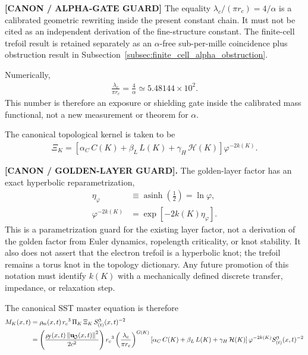 \documentclass[11pt]{article}
\theoremstyle{definition}
\theoremstyle{plain}
\theoremstyle{remark}
\newcommand{\swirlarrow}{\mathchoice{\mkern-2mu\scriptstyle\boldsymbol{\circlearrowleft}}{\mkern-2mu\scriptstyle\boldsymbol{\circlearrowleft}}{\mkern-2mu\scriptscriptstyle\boldsymbol{\circlearrowleft}}{\mkern-2mu\scriptscriptstyle\boldsymbol{\circlearrowleft}}}
\newcommand{\rhoF}{{\rho_{\!f}}}
\newcommand{\rhoM}{\rho_{\!m}}
\newcommand{\SwirlClock}{{S_{(t)}^{\swirlarrow}}}
\newcommand{\rc}{{r_c}}
\newcommand{\uswirl}{\mathbf{u}_{\!\boldsymbol{\circlearrowleft}}}
\begin{document}
        \textbf{[CANON / ALPHA-GATE GUARD]} The equality \(\lambda_c/(\pi\rc)=4/\alpha\) is a calibrated geometric rewriting inside the present constant chain. It must not be cited as an independent derivation of the fine-structure constant. The finite-cell trefoil result is retained separately as an \(\alpha\)-free sub-per-mille coincidence plus obstruction result in Subsection~\ref{subsec:finite_cell_alpha_obstruction}.

        Numerically,
        \begin{align}
            \frac{\lambda_c}{\pi\rc}
            =
            \frac{4}{\alpha}
            \simeq 5.48144\times10^{2}.
            \label{eq:alpha_gate_numeric_guard}
        \end{align}
        This number is therefore an exposure or shielding gate inside the calibrated mass functional, not a new measurement or theorem for \(\alpha\).


        The canonical topological kernel is taken to be
        \begin{align}
            \Xi_K = \left[ \alpha_C\,C(K) + \beta_L\,L(K) + \gamma_H\,\mathcal{H}(K) \right] \varphi^{-2k(K)} .
        \end{align}

        \textbf{[CANON / GOLDEN-LAYER GUARD].}
        The golden-layer factor has an exact hyperbolic reparametrization,
        \begin{align}
            \eta_\varphi
            &\equiv
            \operatorname{asinh}\!\left(\frac12\right)
            =\ln\varphi,
            \label{eq:golden_layer_rapidity_def}\\
            \varphi^{-2k(K)}
            &=
            \exp\!\left[-2k(K)\eta_\varphi\right].
            \label{eq:golden_layer_rapidity_guard}
        \end{align}
        This is a parametrization guard for the existing layer factor, not a
        derivation of the golden factor from Euler dynamics, ropelength
        criticality, or knot stability.  It also does not assert that the
        electron trefoil is a hyperbolic knot; the trefoil remains a torus knot
        in the topology dictionary.  Any future promotion of this notation must
        identify \(k(K)\) with a mechanically defined discrete transfer,
        impedance, or relaxation step.

        The canonical SST master equation is therefore
        \begin{align}
            M_K(x,t)
            &= \rhoM(x,t)\,\rc^3\,\Pi_K\,\Xi_K\,\SwirlClock(x,t)^{-2} \\
            &= \left( \frac{\rhoF(x,t)\,\norm{\uswirl(x,t)}^2}{2c^2} \right)
               \rc^3
               \left( \frac{\lambda_c}{\pi \rc} \right)^{G(K)}
               \left[ \alpha_C\,C(K) + \beta_L\,L(K) + \gamma_H\,\mathcal{H}(K) \right]
               \varphi^{-2k(K)}
               \SwirlClock(x,t)^{-2}
            \label{eq:sst_master_equation}
        \end{align}
\end{document}
